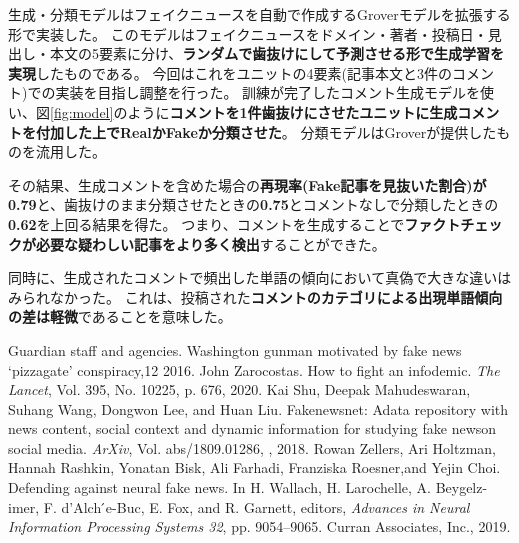 {	生成・分類モデルはフェイクニュースを自動で作成するGroverモデル\cite{NIPS2019_9106}を拡張する形で実装した。
	このモデルはフェイクニュースをドメイン・著者・投稿日・見出し・本文の5要素に分け、\textbf{ランダムで歯抜けにして予測させる形で生成学習を実現}したものである。
	今回はこれをユニットの4要素(記事本文と3件のコメント)での実装を目指し調整を行った。
	訓練が完了したコメント生成モデルを使い、図\ref{fig:model}のように\textbf{コメントを1件歯抜けにさせたユニットに生成コメントを付加した上でRealかFakeか分類させた}。
	分類モデルはGroverが提供したものを流用した。

	その結果、生成コメントを含めた場合の\textbf{再現率(Fake記事を見抜いた割合)が0.79}と、歯抜けのまま分類させたときの\textbf{0.75}とコメントなしで分類したときの\textbf{0.62}を上回る結果を得た。
	つまり、コメントを生成することで\textbf{ファクトチェックが必要な疑わしい記事をより多く検出}することができた。

	同時に、生成されたコメントで頻出した単語の傾向において真偽で大きな違いはみられなかった。
	これは、投稿された\textbf{コメントのカテゴリによる出現単語傾向の差は軽微}であることを意味した。

	{\small 
	\begin{thebibliography}{99}
		 Guardian staff and agencies. Washington gunman motivated by fake news `pizzagate' conspiracy,12 2016.
		 John Zarocostas. How to fight an infodemic. \textit{The Lancet}, Vol. 395, No. 10225, p. 676, 2020.
		 Kai Shu, Deepak Mahudeswaran, Suhang Wang, Dongwon Lee, and Huan Liu. Fakenewsnet: Adata repository with news content, social context and dynamic information for studying fake newson social media. \textit{ArXiv}, Vol. abs/1809.01286, , 2018.
		 Rowan Zellers, Ari Holtzman, Hannah Rashkin, Yonatan Bisk, Ali Farhadi, Franziska Roesner,and Yejin Choi. Defending against neural fake news. In H. Wallach, H. Larochelle, A. Beygelz-imer, F. d'Alch ́e-Buc, E. Fox, and R. Garnett, editors, \textit{Advances in Neural Information Processing Systems 32}, pp. 9054–9065. Curran Associates, Inc., 2019.
	\end{thebibliography}
	}
}

